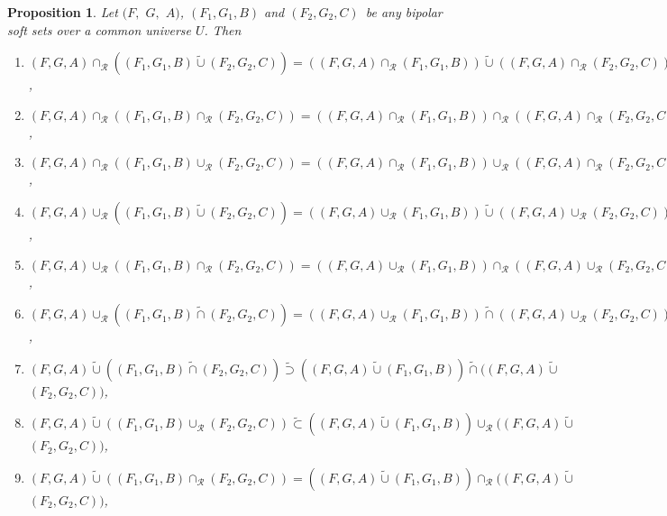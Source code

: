 \documentclass{amsart}
\theoremstyle{plain}
\newtheorem{proposition}{Proposition}
\numberwithin{equation}{section}
\begin{document}
\begin{proposition}
Let $(F,$ $G,$ $A)$, $(F_{1},G_{1},B)$ and $(F_{2},G_{2},C)$\ be any \textit{bipolar soft set}s over a common universe $U$. Then

\begin{enumerate}
\item $(F,G,A)\cap _{\mathcal{R}}((F_{1},G_{1},B)\tilde{\cup}(F_{2},G_{2},C))=((F,G,A)\cap _{\mathcal{R}}(F_{1},G_{1},B))\tilde{\cup}((F,G,A)\cap _{\mathcal{R}}(F_{2},G_{2},C))$,

\item $(F,G,A)\cap _{\mathcal{R}}((F_{1},G_{1},B)\cap _{\mathcal{R}}(F_{2},G_{2},C))=((F,G,A)\cap _{\mathcal{R}}(F_{1},G_{1},B))\cap _{\mathcal{R}}((F,G,A)\cap _{\mathcal{R}}(F_{2},G_{2},C))$,

\item $(F,G,A)\cap _{\mathcal{R}}((F_{1},G_{1},B)\cup _{\mathcal{R}}(F_{2},G_{2},C))=((F,G,A)\cap _{\mathcal{R}}(F_{1},G_{1},B))\cup _{\mathcal{R}}((F,G,A)\cap _{\mathcal{R}}(F_{2},G_{2},C))$,

\item $(F,G,A)\cup _{\mathcal{R}}((F_{1},G_{1},B)\tilde{\cup}(F_{2},G_{2},C))=((F,G,A)\cup _{\mathcal{R}}(F_{1},G_{1},B))\tilde{\cup}((F,G,A)\cup _{\mathcal{R}}(F_{2},G_{2},C))$,

\item $(F,G,A)\cup _{\mathcal{R}}((F_{1},G_{1},B)\cap _{\mathcal{R}}(F_{2},G_{2},C))=((F,G,A)\cup _{\mathcal{R}}(F_{1},G_{1},B))\cap _{\mathcal{R}}((F,G,A)\cup _{\mathcal{R}}(F_{2},G_{2},C))$,

\item $(F,G,A)\cup _{\mathcal{R}}((F_{1},G_{1},B)\tilde{\cap}(F_{2},G_{2},C))=((F,G,A)\cup _{\mathcal{R}}(F_{1},G_{1},B))\tilde{\cap}((F,G,A)\cup _{\mathcal{R}}(F_{2},G_{2},C))$,

\item $(F,G,A)\tilde{\cup}((F_{1},G_{1},B)\tilde{\cap}(F_{2},G_{2},C))\tilde{\supset}((F,G,A)\tilde{\cup}(F_{1},G_{1},B))\tilde{\cap}((F,G,A)\tilde{\cup}$
$(F_{2},G_{2},C))$,

\item $(F,G,A)\tilde{\cup}((F_{1},G_{1},B)\cup _{\mathcal{R}}(F_{2},G_{2},C))\tilde{\subset}((F,G,A)\tilde{\cup}(F_{1},G_{1},B))\cup _{\mathcal{R}}((F,G,A)\tilde{\cup}$ $(F_{2},G_{2},C))$,

\item $(F,G,A)\tilde{\cup}((F_{1},G_{1},B)\cap _{\mathcal{R}}(F_{2},G_{2},C))=((F,G,A)\tilde{\cup}(F_{1},G_{1},B))\cap _{\mathcal{R}}((F,G,A)\tilde{\cup}$ $(F_{2},G_{2},C))$,


\end{enumerate}
\end{proposition}
\end{document}
